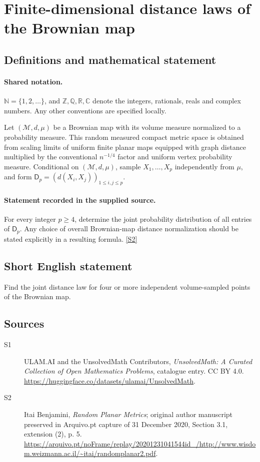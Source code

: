 \documentclass[11pt]{article}
\newcommand{\sref}[2]{\hyperlink{source:#1:#2}{[S#2]}}
\begin{document}
\section{Finite-dimensional distance laws of the Brownian map}\label{statement}

\subsection{Definitions and mathematical statement}

\paragraph{Shared notation.}$\mathbb N=\{1,2,\ldots\}$, and $\mathbb Z,\mathbb Q,\mathbb R,\mathbb C$ denote the integers, rationals, reals and complex numbers. Any other conventions are specified locally.


Let $(\mathcal M,d,\mu)$ be a Brownian map with its volume measure normalized to a probability measure. This random measured compact metric space is obtained from scaling limits of uniform finite planar maps equipped with graph distance multiplied by the conventional $n^{-1/4}$ factor and uniform vertex probability measure. Conditional on $(\mathcal M,d,\mu)$, sample $X_1,\ldots,X_p$ independently from $\mu$, and form $\mathsf D_p=(d(X_i,X_j))_{1\le i,j\le p}$.
\paragraph{Statement recorded in the supplied source.}
For every integer $p\ge4$, determine the joint probability distribution of all entries of $\mathsf D_p$. Any choice of overall Brownian-map distance normalization should be stated explicitly in a resulting formula. \sref{statement}{2}
\subsection{Short English statement}
Find the joint distance law for four or more independent volume-sampled points of the Brownian map.
\subsection{Sources}
\begin{description}
\item[\hypertarget{source:statement:1}{S1}] ULAM.AI and the UnsolvedMath Contributors, \emph{UnsolvedMath: A Curated Collection of Open Mathematics Problems}, catalogue entry. CC BY 4.0. \url{https://huggingface.co/datasets/ulamai/UnsolvedMath}.
\item[\hypertarget{source:statement:2}{S2}] Itai Benjamini, \emph{Random Planar Metrics}; original author manuscript preserved in Arquivo.pt capture of 31 December 2020, Section 3.1, extension (2), p. 5. \url{https://arquivo.pt/noFrame/replay/20201231041544id_/http://www.wisdom.weizmann.ac.il/~itai/randomplanar2.pdf}.
\end{description}
\label{end:statement}
\end{document}
